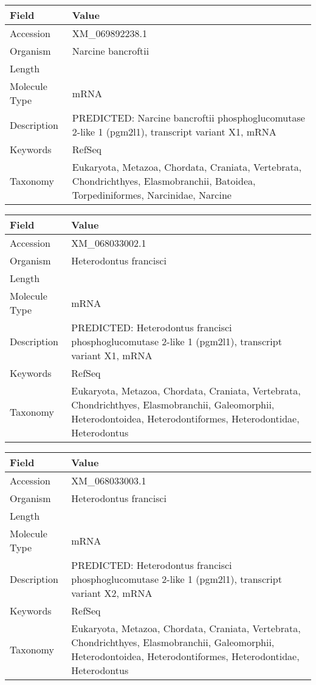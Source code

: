 \documentclass[10pt]{article}
\begin{document}
{\footnotesize
\begin{longtable}{>{\raggedright\arraybackslash}p{4.5cm} >{\raggedright\arraybackslash}p{11.5cm}}
\textbf{Field} & \textbf{Value} \\
\hline
Accession & XM\_069892238.1 \\
Organism & Narcine bancroftii \\
Length & 7267 \\
Molecule Type & mRNA \\
Description & PREDICTED: Narcine bancroftii phosphoglucomutase 2-like 1 (pgm2l1), transcript variant X1, mRNA \\
Keywords & RefSeq \\
Taxonomy & Eukaryota, Metazoa, Chordata, Craniata, Vertebrata, Chondrichthyes, Elasmobranchii, Batoidea, Torpediniformes, Narcinidae, Narcine \\
\end{longtable}
}

{\footnotesize
\begin{longtable}{>{\raggedright\arraybackslash}p{4.5cm} >{\raggedright\arraybackslash}p{11.5cm}}
\textbf{Field} & \textbf{Value} \\
\hline
Accession & XM\_068033002.1 \\
Organism & Heterodontus francisci \\
Length & 6560 \\
Molecule Type & mRNA \\
Description & PREDICTED: Heterodontus francisci phosphoglucomutase 2-like 1 (pgm2l1), transcript variant X1, mRNA \\
Keywords & RefSeq \\
Taxonomy & Eukaryota, Metazoa, Chordata, Craniata, Vertebrata, Chondrichthyes, Elasmobranchii, Galeomorphii, Heterodontoidea, Heterodontiformes, Heterodontidae, Heterodontus \\
\end{longtable}
}

{\footnotesize
\begin{longtable}{>{\raggedright\arraybackslash}p{4.5cm} >{\raggedright\arraybackslash}p{11.5cm}}
\textbf{Field} & \textbf{Value} \\
\hline
Accession & XM\_068033003.1 \\
Organism & Heterodontus francisci \\
Length & 6325 \\
Molecule Type & mRNA \\
Description & PREDICTED: Heterodontus francisci phosphoglucomutase 2-like 1 (pgm2l1), transcript variant X2, mRNA \\
Keywords & RefSeq \\
Taxonomy & Eukaryota, Metazoa, Chordata, Craniata, Vertebrata, Chondrichthyes, Elasmobranchii, Galeomorphii, Heterodontoidea, Heterodontiformes, Heterodontidae, Heterodontus \\
\end{longtable}
}
\end{document}
